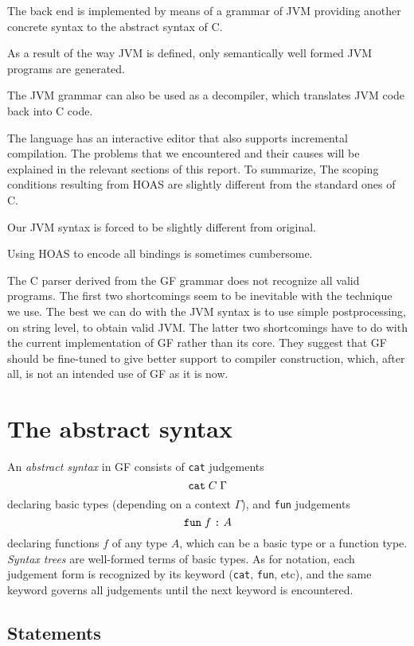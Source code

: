 \documentclass[12pt]{article}
\newcommand{\empha}[1]{{\em #1}}
\begin{document}
The back end is implemented by means of a grammar of JVM providing
another concrete syntax to the abstract syntax of C.

As a result of the way JVM is defined, only semantically well formed
JVM programs are generated.

The JVM grammar can also be used as a decompiler, which translates
JVM code back into C code.

The language has an interactive editor that also supports incremental
compilation.
\enqu
The problems that we encountered and their causes will be explained in 
the relevant sections of this report. To summarize,
\bequ
The scoping conditions resulting from HOAS are slightly different
from the standard ones of C.

Our JVM syntax is forced to be slightly different from original.

Using HOAS to encode all bindings is sometimes cumbersome.

The C parser derived from the GF grammar does not recognize all
valid programs.
\enqu
The first two shortcomings seem to be inevitable with the technique
we use. The best we can do with the JVM syntax is to use simple
postprocessing, on string level, to obtain valid JVM. The latter 
two shortcomings have to do with the current implementation of GF
rather than its core. They
suggest that GF should be fine-tuned to give better support
to compiler construction, which, after all, is not an intended
use of GF as it is now.



\section{The abstract syntax}

An \empha{abstract syntax} in GF consists of \texttt{cat} judgements
\[
\mbox{\texttt{cat}} \; C \; \Gamma
\]
declaring basic types (depending on a context $\Gamma$), 
and \texttt{fun} judgements 
\[
\mbox{\texttt{fun}} \; f \; \mbox{\texttt{:}} \; A
\]
declaring functions $f$ of any type $A$, which can be a basic type or
a function type.
\empha{Syntax trees} are well-formed terms of basic
types. As for notation, each judgement form is recognized by
its keyword (\texttt{cat}, \texttt{fun}, etc), 
and the same keyword governs all judgements
until the next keyword is encountered.



\subsection{Statements}
\end{document}

